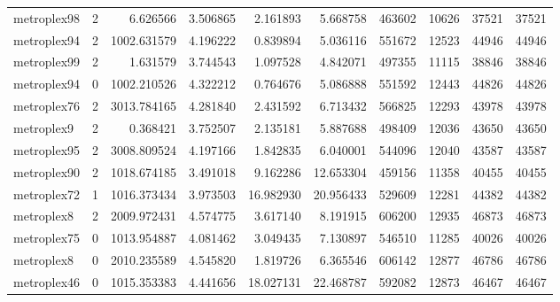 \begin{longtable}{|l|r|r|r|r|r|r|r|r|r|}
metroplex98 & 2 & 6.626566 & 3.506865 & 2.161893 & 5.668758 & 463602 & 10626 & 37521 & 37521 \\
metroplex94 & 2 & 1002.631579 & 4.196222 & 0.839894 & 5.036116 & 551672 & 12523 & 44946 & 44946 \\
metroplex99 & 2 & 1.631579 & 3.744543 & 1.097528 & 4.842071 & 497355 & 11115 & 38846 & 38846 \\
metroplex94 & 0 & 1002.210526 & 4.322212 & 0.764676 & 5.086888 & 551592 & 12443 & 44826 & 44826 \\
metroplex76 & 2 & 3013.784165 & 4.281840 & 2.431592 & 6.713432 & 566825 & 12293 & 43978 & 43978 \\
metroplex9 & 2 & 0.368421 & 3.752507 & 2.135181 & 5.887688 & 498409 & 12036 & 43650 & 43650 \\
metroplex95 & 2 & 3008.809524 & 4.197166 & 1.842835 & 6.040001 & 544096 & 12040 & 43587 & 43587 \\
metroplex90 & 2 & 1018.674185 & 3.491018 & 9.162286 & 12.653304 & 459156 & 11358 & 40455 & 40455 \\
metroplex72 & 1 & 1016.373434 & 3.973503 & 16.982930 & 20.956433 & 529609 & 12281 & 44382 & 44382 \\
metroplex8 & 2 & 2009.972431 & 4.574775 & 3.617140 & 8.191915 & 606200 & 12935 & 46873 & 46873 \\
metroplex75 & 0 & 1013.954887 & 4.081462 & 3.049435 & 7.130897 & 546510 & 11285 & 40026 & 40026 \\
metroplex8 & 0 & 2010.235589 & 4.545820 & 1.819726 & 6.365546 & 606142 & 12877 & 46786 & 46786 \\
metroplex46 & 0 & 1015.353383 & 4.441656 & 18.027131 & 22.468787 & 592082 & 12873 & 46467 & 46467 \\
\end{longtable}
